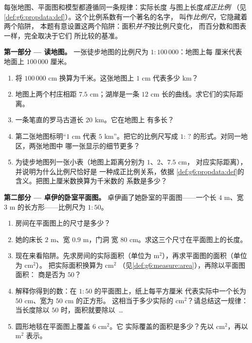 \begin{problem}
\label{pb:g6:propdata:1}
每张地图、平面图和模型都遵循同一条规律：实际长度
与图上长度\emph{成正比例}
（见\cref{def:g6:propdata:def}）。这个比例系数有一个著名的名字，
叫作\emph{比例尺}，它隐藏着两个陷阱，
本题有意设置这两个陷阱：面积\emph{并不}按比例尺变化，
而百分数和图表一样，完全取决于它们
所比较的基准。

\medskip
\noindent\textbf{第一部分 --- 读地图。}
一张徒步地图的比例尺为 $1:100\,000$：地图上每
厘米代表地面上 $100\,000$ 厘米。
\begin{enumerate}
  \item 将 $100\,000$ cm 换算为千米。这张地图上 $1$ cm
        代表多少 km？
  \item 地图上两个村庄相距 $7.5$ cm；湖岸是一条
        $12$ cm 长的曲线。求它们的实际距离。
  \item 一条笔直的罗马古道长 $20$ km。它在地图上
        有多长？
  \item 第二张地图标明“$1$ cm 代表 $5$ km”。把它的比例尺写成
        $1: \,?$ 的形式。对同一地区，两张地图中
        哪一张显示的细节更多？
  \item 为徒步地图列一张小表（地图上距离分别为 $1$、$2$、$7.5$ cm，
        对应实际距离），并说明为什么比例尺恰好是
        一种成正比例关系，依据
        \cref{def:g6:propdata:def}的含义。把图上厘米数换算为千米数的
        系数是多少？
\end{enumerate}

\medskip
\noindent\textbf{第二部分 --- 卓伊的卧室平面图。}
卓伊画了她卧室的平面图——一个长 $4$ m、宽
$3$ m 的长方形——比例尺为 $1:50$。
\begin{enumerate}[resume]
  \item 房间在平面图上的尺寸是多少？
  \item 她的床长 $2$ m、宽 $0.9$ m，门洞
        宽 $80$ cm。求这三个尺寸在平面图上的长度。
  \item 现在来看陷阱。先求房间的实际面积（单位为
        m$^2$），再求平面图的面积（单位为 cm$^2$）。
        把实际面积换算为 cm$^2$
        （见\cref{def:g6:measure:area}），再除以平面图面积：
        商是否为 $50$？
  \item 解释你得到的数：在 $1:50$ 的平面图上，纸上每平方厘米
        代表实际中一个长为 $50$ cm、宽为 $50$ cm 的正方形。
        这相当于多少实际的 cm$^2$？请总结这一规律：
        当长度除以 $50$ 时，面积就要除以
        \,\dots
  \item 圆形地毯在平面图上覆盖 $6$ cm$^2$。它
        实际覆盖的面积是多少？先以 cm$^2$，再以 m$^2$ 表示。
\end{enumerate}


\end{problem}
